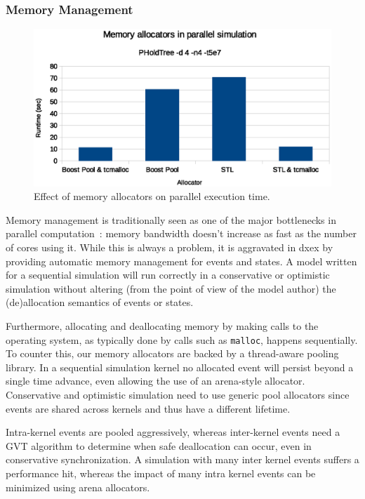 \subsubsection{Memory Management}
\label{sec:4-subsec:overhead-pgraph:memory}
\begin{figure}
    \center
    \includegraphics[width=\modelfraction\columnwidth]{fig/memory_allocators_parallel.eps}
    \caption{Effect of memory allocators on parallel execution time.}
    \label{fig:memallocators_parallel}
\end{figure}
Memory management is traditionally seen as one of the major bottlenecks in parallel computation~\cite{WhatEveryComputerProgrammerShouldKnowAboutMemory}: memory bandwidth doesn't increase as fast as the number of cores using it.
While this is always a problem, it is aggravated in dxex by providing automatic memory management for events and states.
A model written for a sequential simulation will run correctly in a conservative or optimistic simulation without altering (from the point of view of the model author) the (de)allocation semantics of events or states.

Furthermore, allocating and deallocating memory by making calls to the operating system, as typically done by calls such as \texttt{malloc}, happens sequentially.
To counter this, our memory allocators are backed by a thread-aware pooling library.
In a sequential simulation kernel no allocated event will persist beyond a single time advance, even allowing the use of an arena-style allocator.
Conservative and optimistic simulation need to use generic pool allocators since events are shared across kernels and thus have a different lifetime.

Intra-kernel events are pooled aggressively, whereas inter-kernel events need a GVT algorithm to determine when safe deallocation can occur, even in conservative synchronization.
A simulation with many inter kernel events suffers a performance hit, whereas the impact of many intra kernel events can be minimized using arena allocators.

